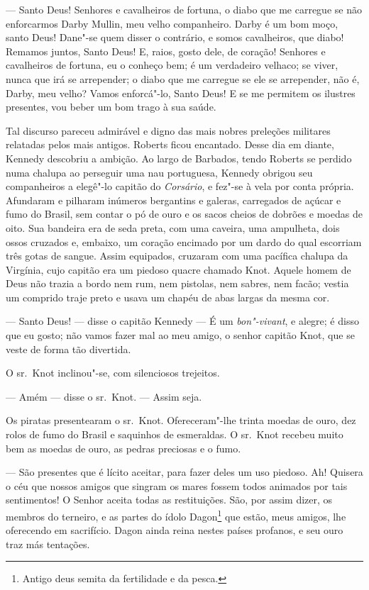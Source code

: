 --- Santo Deus! Senhores e cavalheiros de fortuna, o diabo que me carregue se
não enforcarmos Darby Mullin, meu velho companheiro. Darby é um bom moço,
santo Deus! Dane"-se quem disser o contrário, e somos cavalheiros, que
diabo! Remamos juntos, Santo Deus! E, raios, gosto dele, de coração!
Senhores e cavalheiros de fortuna, eu o conheço bem; é um verdadeiro
velhaco; se viver, nunca que irá se arrepender; o diabo que me carregue se
ele se arrepender, não é, Darby, meu velho? Vamos enforcá"-lo, Santo Deus! 
E se me permitem os ilustres presentes, vou beber um bom trago à sua
saúde.

Tal discurso pareceu admirável e digno das mais nobres preleções militares
relatadas pelos mais antigos. Roberts ficou encantado. Desse dia em
diante, Kennedy descobriu a ambição. Ao largo de Barbados, tendo Roberts
se perdido numa chalupa ao perseguir uma nau portuguesa, Kennedy obrigou
seu companheiros a elegê"-lo capitão do \textit{Corsário}, e fez"-se à vela
por conta própria. Afundaram e pilharam inúmeros bergantins e galeras,
carregados de açúcar e fumo do Brasil, sem contar o pó de ouro e os sacos
cheios de dobrões e moedas de oito. Sua bandeira era de seda preta, com
uma caveira, uma ampulheta, dois ossos cruzados e, embaixo, um coração
encimado por um dardo do qual escorriam três gotas de sangue. Assim
equipados, cruzaram com uma pacífica chalupa da Virgínia, cujo capitão era
um piedoso quacre chamado Knot. Aquele homem de Deus não trazia a bordo
nem rum, nem pistolas, nem sabres, nem facão; vestia um comprido traje
preto e usava um chapéu de abas largas da mesma cor.

--- Santo Deus! --- disse o capitão Kennedy --- É um \textit{bon"-vivant}, e alegre;
é disso que eu gosto; não vamos fazer mal ao meu amigo, o senhor capitão
Knot, que se veste de forma tão divertida.

O sr.~Knot inclinou"-se, com silenciosos trejeitos.

--- Amém --- disse o sr.~Knot. --- Assim seja.

Os piratas presentearam o sr.~Knot. Ofereceram"-lhe trinta moedas de ouro,
dez rolos de fumo do Brasil e saquinhos de esmeraldas. O sr.~Knot recebeu
muito bem as moedas de ouro, as pedras preciosas e o fumo.

--- São presentes que é lícito aceitar, para fazer deles um uso piedoso. Ah!
Quisera o céu que nossos amigos que singram os mares fossem todos animados
por tais sentimentos! O Senhor aceita todas as restituições. São, por
assim dizer, os membros do terneiro, e as partes do ídolo Dagon\footnote{
Antigo deus semita da fertilidade e da pesca.} que estão, meus
amigos, lhe oferecendo em sacrifício. Dagon ainda reina nestes países
profanos, e seu ouro traz más tentações.

